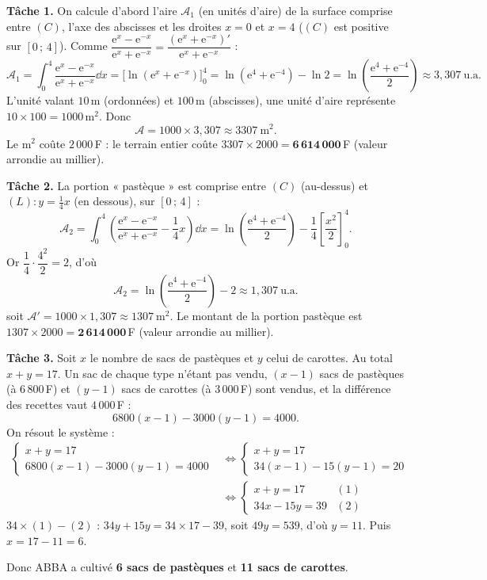 \smallskip
\noindent\textbf{Tâche 1.} On calcule d'abord l'aire $\mathcal A_1$ (en unités d'aire) de la surface comprise entre $(C)$, l'axe des abscisses et les droites $x=0$ et $x=4$ ($(C)$ est positive sur $[0\,;\,4]$). Comme $\dfrac{\mathrm e^{x}-\mathrm e^{-x}}{\mathrm e^{x}+\mathrm e^{-x}}=\dfrac{(\mathrm e^{x}+\mathrm e^{-x})'}{\mathrm e^{x}+\mathrm e^{-x}}$ :
\[
\mathcal A_1=\int_0^4\frac{\mathrm e^{x}-\mathrm e^{-x}}{\mathrm e^{x}+\mathrm e^{-x}}\dd x=\Big[\ln(\mathrm e^{x}+\mathrm e^{-x})\Big]_0^4
=\ln(\mathrm e^{4}+\mathrm e^{-4})-\ln 2=\ln\!\left(\frac{\mathrm e^{4}+\mathrm e^{-4}}{2}\right)\approx3{,}307\ \text{u.a.}
\]
L'unité valant $10$\,m (ordonnées) et $100$\,m (abscisses), une unité d'aire représente $10\times100=1000$\,m$^2$. Donc
\[
\mathcal A=1000\times3{,}307\approx3307\ \text{m}^2 .
\]
Le m$^2$ coûte $2\,000$\,F : le terrain entier coûte $3307\times2000=\mathbf{6\,614\,000}$\,F (valeur arrondie au millier).

\noindent\textbf{Tâche 2.} La portion « pastèque » est comprise entre $(C)$ (au-dessus) et $(L):y=\frac14 x$ (en dessous), sur $[0\,;\,4]$ :
\[
\mathcal A_2=\int_0^4\left(\frac{\mathrm e^{x}-\mathrm e^{-x}}{\mathrm e^{x}+\mathrm e^{-x}}-\frac14 x\right)\dd x
=\ln\!\left(\frac{\mathrm e^{4}+\mathrm e^{-4}}{2}\right)-\frac14\left[\frac{x^2}{2}\right]_0^4 .
\]
Or $\dfrac14\cdot\dfrac{4^2}{2}=2$, d'où
\[
\mathcal A_2=\ln\!\left(\frac{\mathrm e^{4}+\mathrm e^{-4}}{2}\right)-2\approx1{,}307\ \text{u.a.}
\]
soit $\mathcal A'=1000\times1{,}307\approx1307\ \text{m}^2$. Le montant de la portion pastèque est $1307\times2000=\mathbf{2\,614\,000}$\,F (valeur arrondie au millier).

\noindent\textbf{Tâche 3.} Soit $x$ le nombre de sacs de pastèques et $y$ celui de carottes. Au total $x+y=17$. Un sac de chaque type n'étant pas vendu, $(x-1)$ sacs de pastèques (à $6\,800$\,F) et $(y-1)$ sacs de carottes (à $3\,000$\,F) sont vendus, et la différence des recettes vaut $4\,000$\,F :
\[
6800(x-1)-3000(y-1)=4000 .
\]
On résout le système :
\[
\begin{aligned}
\begin{cases}x+y=17\\6800(x-1)-3000(y-1)=4000\end{cases}
&\iff\begin{cases}x+y=17\\34(x-1)-15(y-1)=20\end{cases}\\[4pt]
&\iff\begin{cases}x+y=17 & (1)\\34x-15y=39 & (2)\end{cases}
\end{aligned}
\]
$34\times(1)-(2)$ : $34y+15y=34\times17-39$, soit $49y=539$, d'où $y=11$. Puis $x=17-11=6$.

\noindent Donc ABBA a cultivé \textbf{6 sacs de pastèques} et \textbf{11 sacs de carottes}.
